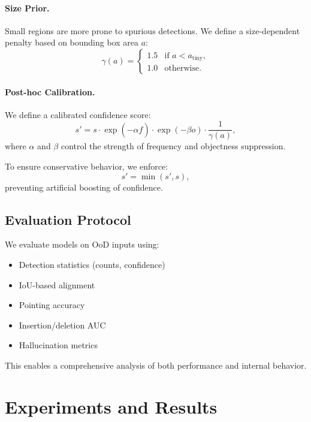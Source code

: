 \paragraph{Size Prior.}
Small regions are more prone to spurious detections. We define a size-dependent penalty based on bounding box area $a$:
\begin{equation}
\gamma(a) =
\begin{cases}
1.5 & \text{if } a < a_{\text{tiny}}, \\
1.0 & \text{otherwise}.
\end{cases}
\end{equation}

\paragraph{Post-hoc Calibration.}
We define a calibrated confidence score:
\begin{equation}
    s' = s \cdot \exp(-\alpha \hat{f}) \cdot \exp(-\beta o) \cdot \frac{1}{\gamma(a)},
\end{equation}
where $\alpha$ and $\beta$ control the strength of frequency and objectness suppression.

To ensure conservative behavior, we enforce:
\begin{equation}
    s' = \min(s', s),
\end{equation}
preventing artificial boosting of confidence.

\subsection{Evaluation Protocol}

We evaluate models on OoD inputs using:

\begin{itemize}
\item Detection statistics (counts, confidence)
\item IoU-based alignment
\item Pointing accuracy
\item Insertion/deletion AUC
\item Hallucination metrics
\end{itemize}

This enables a comprehensive analysis of both performance and internal behavior.

\section{Experiments and Results}
\label{sec:experiments_results}


